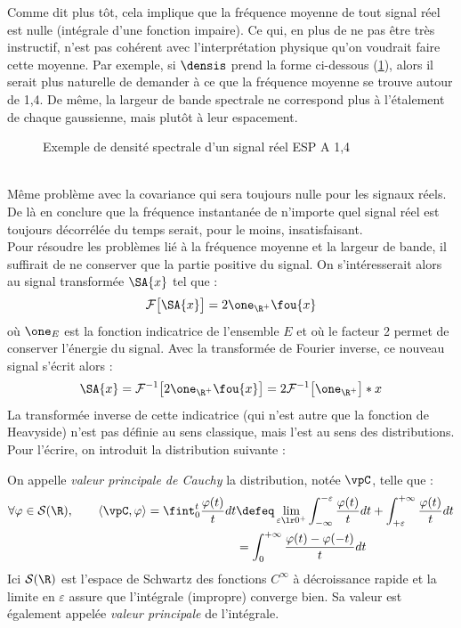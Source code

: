 Comme dit plus tôt, cela implique que la fréquence moyenne de tout signal réel est nulle (intégrale d'une fonction impaire). Ce qui, en plus de ne pas être très instructif, n'est pas cohérent avec l'interprétation physique qu'on voudrait faire cette moyenne. Par exemple, si $\densis$ prend la forme ci-dessous (\cref{fig:densi_spec_sym}), alors il serait plus naturelle de demander à ce que la fréquence moyenne se trouve autour de 1,4. De même, la largeur de bande spectrale ne correspond plus à l'étalement de chaque gaussienne, mais plutôt à leur espacement.
\\
\begin{figure}[h]\centering
	\caption{Exemple de densité spectrale d'un signal réel ESP A 1,4}
	\label{fig:densi_spec_sym}
\end{figure}
\\
Même problème avec la covariance qui sera toujours nulle pour les signaux réels. De là en conclure que la fréquence instantanée de n'importe quel signal réel est toujours décorrélée du temps serait, pour le moins, insatisfaisant.
\\

Pour résoudre les problèmes lié à la fréquence moyenne et la largeur de bande, il suffirait de ne conserver que la partie positive du signal. On s'intéresserait alors au signal transformée $\SA{x}$ tel que :
\[\mathcal{F}\big[\SA{x}\big] = 2\one_{\R^+}\fou{x}\]
où $\one_E$ est la fonction indicatrice de l'ensemble $E$ et où le facteur 2 permet de conserver l'énergie du signal.
Avec la transformée de Fourier inverse, ce nouveau signal s'écrit alors :
\[\SA{x} = \mathcal{F}^{-1}\big[ 2\one_{\R^+}\fou{x} \big] = 2 \mathcal{F}^{-1}\big[\one_{\R^+}\big] * x\]
La transformée inverse de cette indicatrice (qui n'est autre que la fonction de Heavyside) n'est pas définie au sens classique, mais l'est au sens des distributions. Pour l'écrire, on introduit la distribution suivante :


\begin{definition}\label{def:vp&Hilb}
	On appelle \emph{valeur principale de Cauchy} la distribution, notée $\vpC$, telle que :
	\begin{equation}
		\begin{aligned}
		\forall \varphi\in\mathcal{S}(\R),\qquad 
			\left\langle \vpC, \varphi \right\rangle 
			= \fint_0^t \frac{\varphi(t)}{t}dt 
			&\defeq \lim_{\varepsilon\lr0^+} \int_{-\infty}^{-\varepsilon} \frac{\varphi(t)}{t}dt + \int_{+\varepsilon}^{+\infty} \frac{\varphi(t)}{t}dt \\
			&= \int_0^{+\infty} \frac{\varphi(t) - \varphi(-t)}{t}dt
		\end{aligned}
	\end{equation}
	Ici $\mathcal{S}(\R)$ est l’espace de Schwartz des fonctions $C^\infty$ à décroissance rapide et la limite en $\varepsilon$ assure que l'intégrale (impropre) converge bien. Sa valeur est également appelée \emph{valeur principale} de l'intégrale. 
\end{definition}

